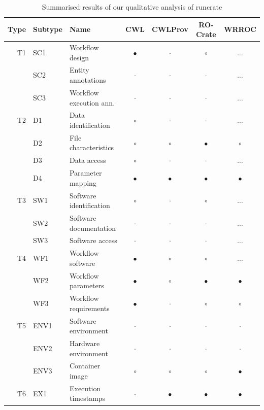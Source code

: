 \begin{table}[tp]
\centering
\caption{Summarised results of our qualitative analysis of runcrate}
\begin{tabular}{r|l|l|c|c|c|c}
\hline
{\bf Type} & {\bf Subtype}      & {\bf Name} & {\bf CWL} & {\bf CWLProv} & {\bf RO-Crate} & {\bf WRROC}  \\ \hline
T1 & SC1 & Workflow design      & $\bullet$ &  $\cdot$ & $\circ$ & $\dots$ \\ 
& SC2 & Entity annotations      & $\cdot$ &  $\cdot$ &  $\cdot$  & $\dots$ \\ 
& SC3 & Workflow execution ann. &  $\cdot$  & $\cdot$ &  $\cdot$ & $\dots$ \\ \hline
T2 & D1 & Data identification   & $\circ$ & $\cdot$ &  $\cdot$ & $\dots$ \\
& D2 & File characteristics     & $\circ$ & $\circ$ & $\bullet$ & $\circ$ \\
& D3 & Data access              & $\circ$ &  $\cdot$ &  $\cdot$  & $\dots$ \\ 
& D4 & Parameter mapping        & $\bullet$ & $\bullet$ & $\bullet$ & $\bullet$ \\ \hline 
T3 & SW1 & Software identification & $\circ$ &  $\cdot$ & $\circ$ & $\dots$ \\ 
& SW2 & Software documentation  & $\cdot$ &  $\cdot$ & $\cdot$ & $\dots$ \\  
& SW3 & Software access         & $\cdot$ &  $\cdot$ & $\cdot$ & $\dots$ \\ \hline 
T4 & WF1 & Workflow software    & $\bullet$ & $\circ$ & $\circ$ & $\dots$ \\ 
& WF2 & Workflow parameters     & $\bullet$ & $\circ$ & $\bullet$ & $\bullet$ \\ 
& WF3 & Workflow requirements   & $\bullet$ &  $\cdot$  &  $\circ$  & $\circ$ \\ \hline 
T5 & ENV1 & Software environment & $\cdot$ & $\cdot$ &  $\cdot$ & $\cdot$ \\ 
& ENV2 & Hardware environment   & $\cdot$ & $\cdot$ &  $\cdot$  & $\cdot$\\ 
& ENV3 & Container image        & $\circ$ & $\circ$ &  $\circ$ & $\bullet$ \\ \hline 
T6 & EX1 & Execution timestamps & $\cdot$ & $\bullet$ & $\bullet$ & $\bullet$ \\ 

\end{tabular}
\end{table}
